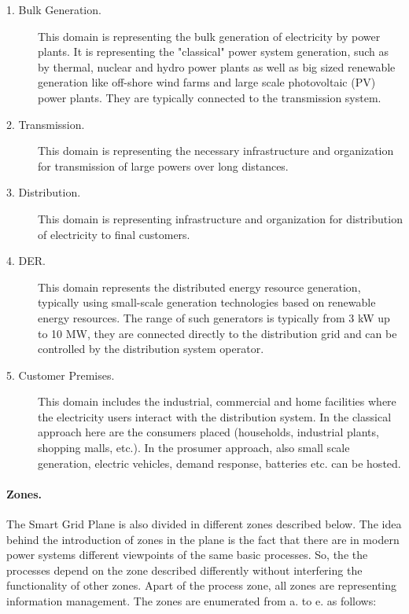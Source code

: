 \documentclass[a4paper,11pt,twoside,openright]{report}
\begin{document}
\begin{description}
	\item[1. Bulk Generation.] This domain is representing the bulk generation of electricity by power plants. It is representing the "classical" power system generation, such as by thermal, nuclear and hydro power plants as well as big sized renewable generation like off-shore wind farms and large scale photovoltaic (PV) power plants. They are typically connected to the transmission system.
	\item[2. Transmission.] This domain is representing the necessary infrastructure and organization for transmission of large powers over long distances.
	\item[3. Distribution.] This domain is representing infrastructure and organization for distribution of electricity to final customers. 
	\item[4. DER.] This domain represents the distributed energy resource generation, typically using small-scale generation technologies based on renewable energy resources. The range of such generators is typically from 3 kW up to  10 MW, they are connected directly to the distribution grid and can be controlled by the distribution system operator. 
	\item[5. Customer Premises.] This domain includes the industrial, commercial and home facilities where the electricity users interact with the distribution system. In the classical approach here are the consumers placed (households, industrial plants, shopping malls, etc.). In the prosumer approach, also small scale generation, electric vehicles, demand response, batteries etc. can be hosted.
\end{description}

\paragraph{Zones.} The Smart Grid Plane is also divided in different zones described below. The idea behind the introduction of zones in the plane is the fact that there are in modern power systems different viewpoints of the same basic processes. So, the the processes depend on the zone described differently without interfering the functionality of other zones. Apart of the process zone, all zones are representing information management. The zones are enumerated from a. to e. as follows:
\end{document}
